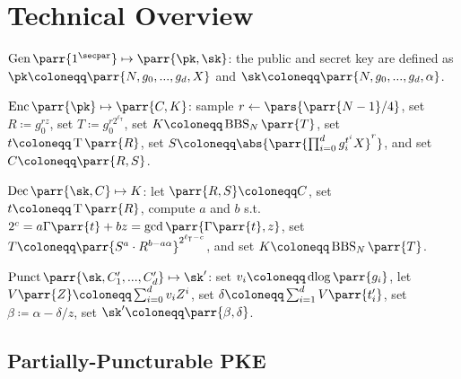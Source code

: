 \section{Technical Overview}
\label{sec:overview}

\begin{sitemize}
    \item \(\Gen\parr{1^\secpar} \mapsto \parr{\pk,\sk}\):
    the public and secret key are defined as \(\pk \coloneqq \parr{N, g_0, ..., g_d, X}\) and \(\sk \coloneqq \parr{N, g_0, ..., g_d, \alpha}\).
    
    \item \(\Enc\parr{\pk} \mapsto \parr{C,K}\):
    sample \(r \gets \pars{\parr{N-1}/4}\),
    set \(R \coloneqq g_0^{r z}\),
    set \(T \coloneqq g_0^{r 2^{\ell_{\mathsf{T}}}}\),
    set \(K \coloneqq \operatorname{BBS}_N\parr{T}\),
    set \(t \coloneqq \operatorname{T}\parr{R}\),
    set \(S \coloneqq \abs{\parr{\prod_{i=0}^d g_i^{t^i} X}^r}\),
    and set \(C \coloneqq \parr{R,S}\).

    \item \(\Dec\parr{\sk,C} \mapsto K\):
    let \(\parr{R,S} \coloneqq C\),
    set \(t \coloneqq \operatorname{T}\parr{R}\),
    compute \(a\) and \(b\) s.t.\ \(2^c = a \Gamma\parr{t} + b z = \gcd\parr{\Gamma\parr{t}, z}\),
    set \(T \coloneqq \parr{S^a \cdot R^{b - a \alpha}}^{2^{\ell_{\mathsf{T}}-c}}\),
    and set \(K \coloneqq \operatorname{BBS}_N\parr{T}\).

    \item \(\Punct\parr{\sk,C'_1,...,C'_d} \mapsto \sk'\):
    set \(v_i \coloneqq \operatorname{dlog}\parr{g_i}\),
    let \(V\parr{Z} \coloneqq \sum_{i=0}^d v_i Z^i\),
    set \(\delta \coloneqq \sum_{i=1}^d V\parr{t'_i}\),
    set \(\beta \coloneqq \alpha - \delta/z\),
    set \(\sk' \coloneqq \parr{\beta, \delta}\).
\end{sitemize}


\subsection{Partially-Puncturable PKE}

